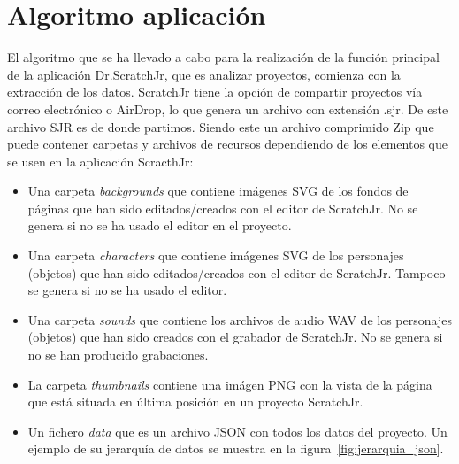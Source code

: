 \documentclass[a4paper, 12pt]{book}
\begin{document}
\section{Algoritmo aplicación} 
\label{sec:algoritmo}


\vspace{5mm}
El algoritmo que se ha llevado a cabo para la realización de la función principal de la aplicación Dr.ScratchJr, que es analizar proyectos, comienza con la extracción de los datos.
ScratchJr tiene la opción de compartir proyectos vía correo electrónico o AirDrop, lo que genera un archivo con extensión .sjr.
De este archivo SJR es de donde partimos.
Siendo este un archivo comprimido Zip que puede contener carpetas y archivos de recursos dependiendo de los elementos que se usen en la aplicación ScracthJr:

\begin{itemize}
    \item Una carpeta \emph{backgrounds} que contiene imágenes SVG de los fondos de páginas que han sido editados/creados con el editor de ScratchJr.
    No se genera si no se ha usado el editor en el proyecto.
    \item Una carpeta \emph{characters} que contiene imágenes SVG de los personajes (objetos) que han sido editados/creados con el editor de ScratchJr.
    Tampoco se genera si no se ha usado el editor.
    \item Una carpeta \emph{sounds} que contiene los archivos de audio WAV de los personajes (objetos) que han sido creados con el grabador de ScratchJr.
    No se genera si no se han producido grabaciones.
    \item La carpeta \emph{thumbnails} contiene una imágen PNG con la vista de la página que está situada en última posición en un proyecto ScratchJr.
    \item Un fichero \emph{data} que es un archivo JSON con todos los datos del proyecto. Un ejemplo de su jerarquía de datos se muestra en la figura~\ref{fig:jerarquia_json}.
\end{itemize}
\end{document}
